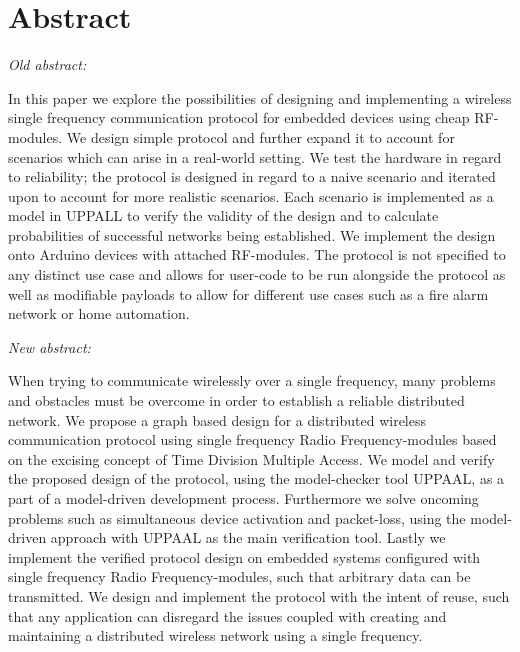 \section{Abstract}
\begin{center}
    \textit{Old abstract:}
\end{center}
In this paper we explore the possibilities of designing and implementing a wireless single frequency communication protocol for embedded devices using cheap RF-modules.
We design simple protocol and further expand it to account for scenarios which can arise in a real-world setting.
We test the hardware in regard to reliability; the protocol is designed in regard to a naive scenario and iterated upon to account for more realistic scenarios.
Each scenario is implemented as a model in UPPALL to verify the validity of the design and to calculate probabilities of successful networks being established.
We implement the design onto Arduino devices with attached RF-modules.
The protocol is not specified to any distinct use case and allows for user-code to be run alongside the protocol as well as modifiable payloads to allow for different use cases such as a fire alarm network or home automation. 
\begin{center}
    \textit{New abstract:}
\end{center}
When trying to communicate wirelessly over a single frequency, many problems and obstacles must be overcome in order to establish a reliable distributed network. 
We propose a graph based design for a distributed wireless communication protocol using single frequency Radio Frequency-modules based on the excising concept of Time Division Multiple Access. 
We model and verify the proposed design of the protocol, using the model-checker tool UPPAAL, as a part of a model-driven development process. 
Furthermore we solve oncoming problems such as simultaneous device activation and packet-loss, using the model-driven approach with UPPAAL as the main verification tool. 
Lastly we implement the verified protocol design on embedded systems configured with single frequency Radio Frequency-modules, such that arbitrary data can be transmitted. 
We design and implement the protocol with the intent of reuse, such that any application can disregard the issues coupled with creating and maintaining a distributed wireless network using a single frequency.
